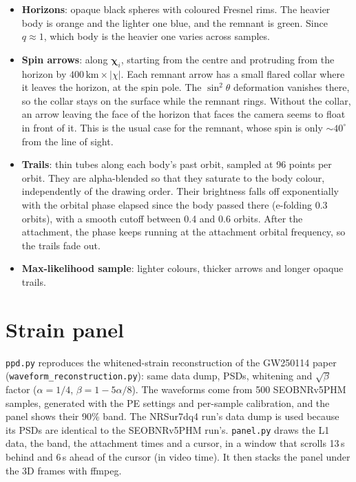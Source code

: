 \documentclass[11pt,a4paper]{article}
\newcommand{\code}[1]{\texttt{#1}}
\newcommand{\vect}[1]{\boldsymbol{#1}}
\begin{document}
\begin{itemize}
  \item \textbf{Horizons}: opaque black spheres with coloured Fresnel rims. The heavier
        body is orange and the lighter one blue, and the remnant is green. Since
        $q\approx1$, which body is the heavier one varies across samples.
  \item \textbf{Spin arrows}: along $\vect{\chi}_i$, starting from the centre and
        protruding from the horizon by $400\,\mathrm{km}\times|\chi|$. Each remnant
        arrow has a small flared collar where it leaves the horizon, at the spin pole.
        The $\sin^2\theta$ deformation vanishes there, so the collar stays on the surface
        while the remnant rings. Without the collar, an arrow leaving the face of the
        horizon that faces the camera seems to float in front of it. This is the usual
        case for the remnant, whose spin is only $\sim40^\circ$ from the line of sight.
  \item \textbf{Trails}: thin tubes along each body's past orbit, sampled at 96 points
        per orbit. They are alpha-blended so that they saturate to the body colour,
        independently of the drawing order. Their brightness falls off exponentially
        with the orbital phase elapsed since the body passed there (e-folding 0.3
        orbits), with a smooth cutoff between 0.4 and 0.6 orbits. After the attachment,
        the phase keeps running at the attachment orbital frequency, so the trails fade
        out.
  \item \textbf{Max-likelihood sample}: lighter colours, thicker arrows and longer opaque
        trails.
\end{itemize}

\section{Strain panel}\label{sec:panel}

\code{ppd.py} reproduces the whitened-strain reconstruction of the GW250114 paper
(\code{waveform\_reconstruction.py}): same data dump, PSDs, whitening and
$\sqrt{\beta}$ factor ($\alpha=1/4$, $\beta = 1-5\alpha/8$). The waveforms come from 500
SEOBNRv5PHM samples, generated with the PE settings and per-sample calibration, and the
panel shows their 90\% band. The NRSur7dq4 run's data dump is used because its PSDs are
identical to the SEOBNRv5PHM run's. \code{panel.py} draws the L1 data, the band, the
attachment times and a cursor, in a window that scrolls 13\,s behind and 6\,s ahead of the
cursor (in video time). It then stacks the panel under the 3D frames with ffmpeg.
\end{document}
